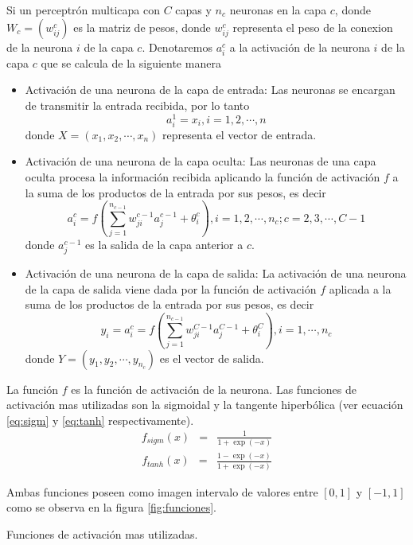 Si un perceptrón multicapa con $C$ capas y $n_c$ neuronas en la capa $c$, donde $W_c = (w^{c}_{ij})$ es la matriz de pesos, donde $w^{c}_{ij}$ representa el peso de la conexion de la neurona $i$ de la capa $c$. Denotaremos $a^{c}_{i}$ a la activación de la neurona $i$ de la capa $c$ que se calcula de la siguiente manera
\begin{itemize}
	\item Activación de una neurona de la capa de entrada: Las neuronas se encargan de transmitir la entrada recibida, por lo tanto $$ a^{1}_{i} = x_{i}, i = 1, 2, \cdots, n$$ donde $X = (x_1, x_2, \cdots, x_n)$ representa el vector de entrada.

	\item Activación de una neurona de la capa oculta: Las neuronas de una capa oculta procesa la información recibida aplicando la función de activación $f$ a la suma de los productos de la entrada por sus pesos, es decir $$ a^{c}_{i} = f\left(\sum^{n_{c - 1}}_{j=1} w^{c - 1}_{ji}a^{c - 1}_{j} + \theta^{c}_{i}\right), i = 1, 2, \cdots, n_c; c = 2, 3, \cdots, C - 1$$ donde $a^{c - 1}_{j}$ es la salida de la capa anterior a $c$.

	\item Activación de una neurona de la capa de salida: La activación de una neurona de la capa de salida viene dada por la función de activación $f$ aplicada a la suma de los productos de la entrada por sus pesos, es decir $$ y_{i} = a^{c}_{i} = f\left(\sum^{n_{c - 1}}_{j=1} w^{C - 1}_{ji}a^{C - 1}_{j} + \theta^{C}_{i}\right), i = 1, \cdots, n_c$$ donde $Y = (y_1, y_2, \cdots, y_{n_{c}})$ es el vector de salida.
\end{itemize}

La función $f$ es la función de activación de la neurona. Las funciones de activación mas utilizadas son la sigmoidal y la tangente hiperbólica (ver ecuación \ref{eq:sigm} y \ref{eq:tanh} respectivamente).
\begin{eqnarray}
	f_{sigm}(x) &=& \frac{1}{1+\exp(-x)}\label{eq:sigm}
\end{eqnarray}
\begin{eqnarray}
	f_{tanh}(x) &=& \frac{1 - \exp(-x)}{1 + \exp(-x)}\label{eq:tanh}
\end{eqnarray}

Ambas funciones poseen como imagen intervalo de valores entre $[0, 1]$ y $[-1, 1]$ como se observa en la figura \ref{fig:funciones}.%

\begin{imagen}
	\scalebox{1.0}{}
	\caption{Funciones de activación mas utilizadas.}
	\label{fig:funciones}
\end{imagen}



